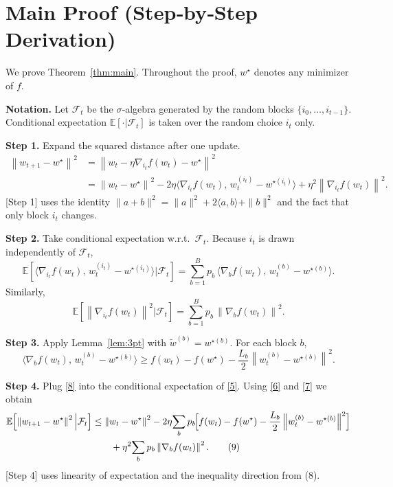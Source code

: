 \documentclass{article}
\newcommand{\E}{\mathbb{E}}
\newcommand{\norm}[1]{\left\lVert #1\right\rVert}
\begin{document}
\section*{Main Proof (Step‑by‑Step Derivation)}
We prove Theorem~\ref{thm:main}. Throughout the proof, $w^{\star}$ denotes any
minimizer of $f$.

\noindent\textbf{Notation.}
Let $\mathcal{F}_{t}$ be the $\sigma$‑algebra generated by the random blocks
$\{i_{0},\dots ,i_{t-1}\}$.  Conditional expectation $\E[\cdot|\mathcal{F}_{t}]$
is taken over the random choice $i_{t}$ only.

\medskip
\noindent\textbf{Step 1.}  Expand the squared distance after one update.
\begin{align}
\norm{w_{t+1}-w^{\star}}^{2}
&= \norm{w_{t}-\eta\nabla_{i_{t}}f(w_{t})-w^{\star}}^{2} \nonumber\\
&= \norm{w_{t}-w^{\star}}^{2}
-2\eta\langle \nabla_{i_{t}}f(w_{t}),\, w_{t}^{(i_{t})}-w^{\star (i_{t})}\rangle
+\eta^{2}\norm{\nabla_{i_{t}}f(w_{t})}^{2}. \tag{5}
\end{align}
[Step 1] uses the identity $\|a+b\|^{2}=\|a\|^{2}+2\langle a,b\rangle+\|b\|^{2}$
and the fact that only block $i_{t}$ changes.

\medskip
\noindent\textbf{Step 2.}  Take conditional expectation w.r.t.\ $\mathcal{F}_{t}$.
Because $i_{t}$ is drawn independently of $\mathcal{F}_{t}$,
\[
\E\!\left[\langle \nabla_{i_{t}}f(w_{t}),\, w_{t}^{(i_{t})}-w^{\star (i_{t})}\rangle
\Big|\mathcal{F}_{t}\right]
= \sum_{b=1}^{B}p_{b}\,
\langle \nabla_{b}f(w_{t}),\, w_{t}^{(b)}-w^{\star (b)}\rangle . \tag{6}
\]
Similarly,
\[
\E\!\left[\norm{\nabla_{i_{t}}f(w_{t})}^{2}\Big|\mathcal{F}_{t}\right]
= \sum_{b=1}^{B}p_{b}\,\norm{\nabla_{b}f(w_{t})}^{2}. \tag{7}
\]

\medskip
\noindent\textbf{Step 3.}  Apply Lemma~\ref{lem:3pt} with $\tilde w^{(b)}=w^{\star (b)}$.
For each block $b$,
\[
\langle \nabla_{b}f(w_{t}),\, w_{t}^{(b)}-w^{\star (b)}\rangle
\ge
f(w_{t})-f(w^{\star})-\frac{L_{b}}{2}\norm{w_{t}^{(b)}-w^{\star (b)}}^{2}.
\tag{8}
\]

\medskip
\noindent\textbf{Step 4.}  Plug \eqref{8} into the conditional expectation of
\eqref{5}. Using \eqref{6} and \eqref{7} we obtain
\begin{align}
\E\!\left[\norm{w_{t+1}-w^{\star}}^{2}\Big|\mathcal{F}_{t}\right]
&\le \norm{w_{t}-w^{\star}}^{2}
-2\eta\!\sum_{b}p_{b}\!\Bigl[f(w_{t})-f(w^{\star})
-\frac{L_{b}}{2}\norm{w_{t}^{(b)}-w^{\star (b)}}^{2}\Bigr]\nonumber\\
&\qquad +\eta^{2}\!\sum_{b}p_{b}\norm{\nabla_{b}f(w_{t})}^{2}. \tag{9}
\end{align}
[Step 4] uses linearity of expectation and the inequality direction from (8).
\end{document}
